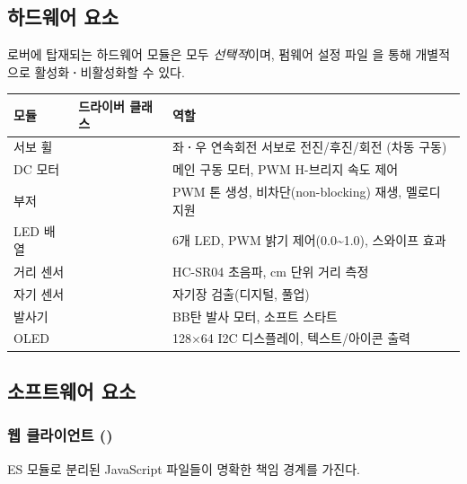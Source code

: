 \subsection{하드웨어 요소}

로버에 탑재되는 하드웨어 모듈은 모두 \emph{선택적}이며, 펌웨어 설정 파일
을 통해 개별적으로 활성화\textbf{·}비활성화할 수 있다.

\begin{longtable}{L{2.6cm} L{2.6cm} L{8.8cm}}
\toprule
{}\textbf{모듈} & \textbf{드라이버 클래스} & \textbf{역할} \\
\midrule
\endhead
서보 휠 &  & 좌\textbf{·}우 연속회전 서보로 전진/후진/회전 (차동 구동) \\
DC 모터 &  & 메인 구동 모터, PWM H-브리지 속도 제어 \\
부저 &  & PWM 톤 생성, 비차단(non-blocking) 재생, 멜로디 지원 \\
LED 배열 &  & 6개 LED, PWM 밝기 제어(0.0\textasciitilde 1.0), 스와이프 효과 \\
거리 센서 &  & HC-SR04 초음파, cm 단위 거리 측정 \\
자기 센서 &  & 자기장 검출(디지털, 풀업) \\
발사기 &  & BB탄 발사 모터, 소프트 스타트 \\
OLED &  & 128$\times$64 I2C 디스플레이, 텍스트/아이콘 출력 \\
\bottomrule
\end{longtable}

\subsection{소프트웨어 요소}

\subsubsection{웹 클라이언트 ()}

ES 모듈로 분리된 JavaScript 파일들이 명확한 책임 경계를 가진다.

